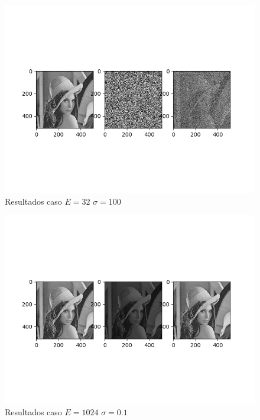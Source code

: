 \begin{figure}[h!]
\includegraphics[scale=0.9]{Imagenes/E32S100}
\centering
\caption{Resultados caso $E=32$ $\sigma = 100$ }
\end{figure}

\begin{figure}[h!]
\includegraphics[scale=0.9]{Imagenes/E1024S01}
\centering
\caption{Resultados caso $E=1024$ $\sigma = 0.1$ }
\end{figure}

